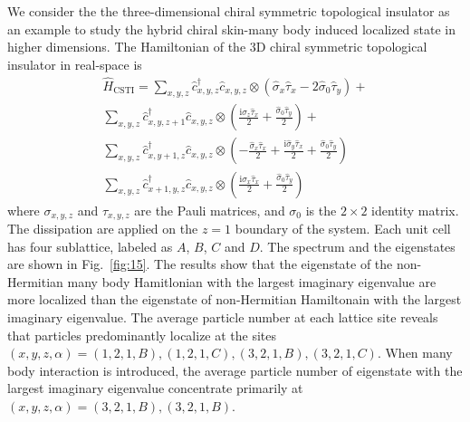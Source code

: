 \documentclass[longbibliography, aps, prx, amsmath, amssymb, amsfonts, twocolumn,superscriptaddress, footinbib]{revtex4-1}
\begin{document}
	We consider the the three-dimensional chiral symmetric topological insulator as an example to study the hybrid chiral skin-many body induced localized state in higher dimensions. The Hamiltonian of the 3D chiral symmetric topological insulator in real-space is
	\begin{equation}
		\begin{split}
			\hat{H}_{\text{CSTI}} = \sum_{x,y,z} \hat{c}_{x,y,z}^{\dagger}\hat{c}_{x,y,z} \otimes (\hat{\sigma}_x \hat{\tau}_x - 2 \hat{\sigma}_0 \hat{\tau}_y) + \\
			\sum_{x,y,z} \hat{c}_{x,y,z+1}^{\dagger}\hat{c}_{x,y,z} \otimes ( \frac{\mathrm{i} \hat{\sigma}_z \hat{\tau}_x}{2} + \frac{\hat{\sigma}_0 \hat{\tau}_y}{2}) + \\
			\sum_{x,y,z} \hat{c}_{x,y+1,z}^{\dagger}\hat{c}_{x,y,z} \otimes (-\frac{\hat{\sigma}_x \hat{\tau}_x}{2} + \frac{\mathrm{i} \hat{\sigma}_y \hat{\tau}_x}{2} + \frac{\hat{\sigma}_0 \hat{\tau}_y}{2})\\
			\sum_{x,y,z} \hat{c}_{x+1,y,z}^{\dagger}\hat{c}_{x,y,z} \otimes ( \frac{\mathrm{i}\hat{\sigma}_x \hat{\tau}_x}{2} + \frac{\hat{\sigma}_0 \hat{\tau}_y}{2} )
		\end{split} %
	\end{equation}
	where $\sigma_{x,y,z}$ and $\tau_{x,y,z}$ are the Pauli matrices, and $\sigma_0$ is the $2\times 2$ identity matrix. The dissipation are applied on the $z=1$ boundary of the system. Each unit cell has four sublattice, labeled as $A$, $B$, $C$ and $D$. 
	The spectrum and the eigenstates are shown in Fig.~\ref{fig:15}. The results show that the eigenstate of the non-Hermitian many body Hamitlonian with the largest imaginary eigenvalue are more localized than the eigenstate of non-Hermitian Hamiltonain with the largest imaginary eigenvalue. 
	The average particle number at each lattice site reveals that particles predominantly localize at the sites $(x,y,z,\alpha)=(1,2,1,B),(1,2,1,C),(3,2,1,B),(3,2,1,C)$. When many body interaction is introduced, the average particle number of eigenstate with the largest imaginary eigenvalue concentrate primarily at $(x,y,z,\alpha)=(3,2,1,B),(3,2,1,B)$. 
\end{document}
